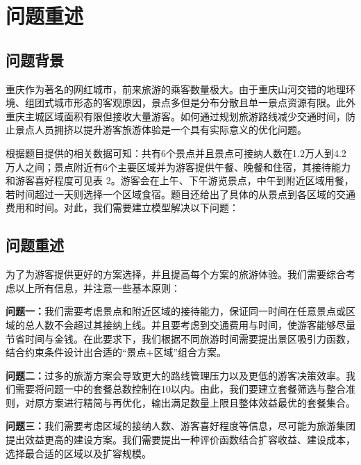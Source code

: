 \chapter[\hspace{0pt}问题重述]{{\heiti{}\hspace{0pt}问题重述}}\label{chapter1: 问题重述}
\removelofgap
\removelotgap
\setcounter{page}{2}  %

\section[\hspace{-2pt}问题背景]{{\heiti{} \hspace{-8pt}问题背景}}\label{section1: 问题背景}

重庆作为著名的网红城市，前来旅游的乘客数量极大。由于重庆山河交错的地理环境、组团式城市形态的客观原因，景点多但是分布分散且单一景点资源有限。此外重庆主城区域面积有限但接收大量游客。如何通过规划旅游路线减少交通时间，防止景点人员拥挤以提升游客旅游体验是一个具有实际意义的优化问题。

根据题目提供的相关数据可知：共有6个景点并且景点可接纳人数在1.2万人到4.2万人之间；景点附近有6个主要区域并为游客提供午餐、晚餐和住宿，其接待能力和游客喜好程度可见表 2。游客会在上午、下午游览景点，中午到附近区域用餐，若时间超过一天则选择一个区域食宿。题目还给出了具体的从景点到各区域的交通费用和时间。对此，我们需要建立模型解决以下问题：

\section[\hspace{-2pt}问题重述]{{\heiti{} \hspace{-8pt}问题重述}}\label{section1: 问题重述}

为了为游客提供更好的方案选择，并且提高每个方案的旅游体验。我们需要综合考虑以上所有信息，并注意一些基本原则：

\textbf{问题一：}我们需要考虑景点和附近区域的接待能力，保证同一时间在任意景点或区域的总人数不会超过其接纳上线。并且要考虑到交通费用与时间，使游客能够尽量节省时间与金钱。在此要求下，我们根据不同旅游时间需要提出景区吸引力函数，结合约束条件设计出合适的“景点+区域”组合方案。


\textbf{问题二：}过多的旅游方案会导致更大的路线管理压力以及更低的游客决策效率。我们需要将问题一中的套餐总数控制在10以内。由此，我们要建立套餐筛选与整合准则，对原方案进行精简与再优化，输出满足数量上限且整体效益最优的套餐集合。

\textbf{问题三：}我们需要考虑区域的接纳人数、游客喜好程度等信息，尽可能为旅游集团提出效益更高的建设方案。我们需要提出一种评价函数结合扩容收益、建设成本，选择最合适的区域以及扩容规模。

